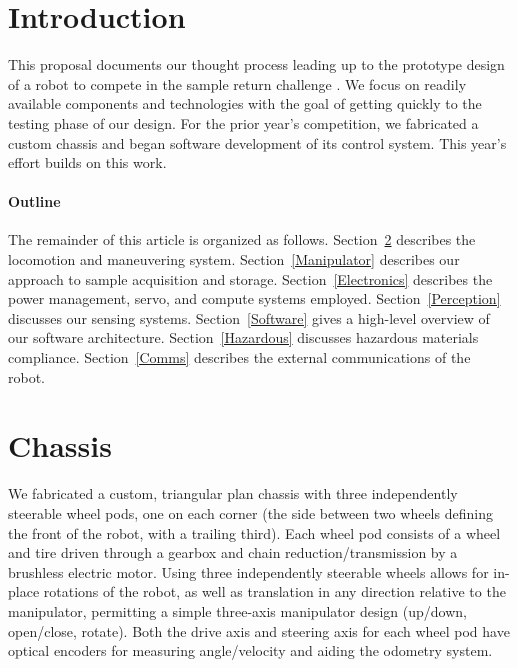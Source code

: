 \documentclass[12pt]{article}
\begin{document}
\section{Introduction}
This proposal documents our thought process leading up to the prototype design
of a robot to compete in the sample return challenge \cite{rules}. We focus on
readily available components and technologies with the goal of getting quickly
to the testing phase of our design. For the prior year's competition, we
fabricated a custom chassis and began software development of its control
system. This year's effort builds on this work.

\paragraph{Outline}
The remainder of this article is organized as follows.
Section~\ref{Chassis} describes the locomotion and maneuvering system.
Section~\ref{Manipulator} describes our approach to sample acquisition and
storage. Section~\ref{Electronics} describes the power management, servo, and
compute systems employed. Section~\ref{Perception} discusses our sensing
systems. Section~\ref{Software} gives a high-level overview of our software
architecture. Section~\ref{Hazardous} discusses hazardous materials compliance.
Section~\ref{Comms} describes the external communications of the robot.


%
%

\section{Chassis}\label{Chassis}

We fabricated a custom, triangular plan chassis with three independently
steerable wheel pods, one on each corner (the side between two wheels defining
the front of the robot, with a trailing third). Each wheel pod consists of a
wheel and tire driven through a gearbox and chain reduction/transmission by a
brushless electric motor. Using three independently steerable wheels allows for
in-place rotations of the robot, as well as translation in any direction
relative to the manipulator, permitting a simple three-axis manipulator design
(up/down, open/close, rotate). Both the drive axis and steering axis for each
wheel pod have optical encoders for measuring angle/velocity and aiding the
odometry system.
\end{document}
